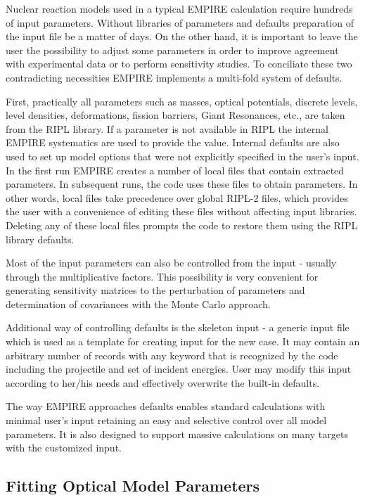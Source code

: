 Nuclear reaction models used in a typical EMPIRE calculation require
hundreds of input parameters. Without libraries of parameters and defaults
preparation of the input file be a matter of days. On the other hand, it is
important to leave the user the possibility to adjust some parameters in
order to improve agreement with experimental data or to perform sensitivity
studies. To conciliate these two contradicting necessities EMPIRE implements
a multi-fold system of defaults.

First, practically all parameters such as masses, optical potentials,
discrete levels, level densities, deformations, fission barriers, Giant
Resonances, etc., are taken from the RIPL library. If a parameter is not
available in RIPL the internal EMPIRE systematics are used to provide the
value. Internal defaults are also used to set up model options that were not
explicitly specified in the user's input. In the first run EMPIRE creates a
number of local files that contain extracted parameters. In subsequent runs,
the code uses these files to obtain parameters. In other words, local files
take precedence over global RIPL-2 files, which provides the user with a
convenience of editing these files without affecting input libraries.
Deleting any of these local files prompts the code to restore them using the
RIPL library defaults.

Most of the input parameters can also be controlled from the input - usually
through the multiplicative factors. This possibility is very convenient for
generating sensitivity matrices to the perturbation of parameters and
determination of covariances with the Monte Carlo approach.

Additional way of controlling defaults is the skeleton input - a generic
input file which is used as a template for creating input for the new case.
It may contain an arbitrary number of records with any keyword that is
recognized by the code including the projectile and set of incident
energies. User may modify this input according to her/his needs and
effectively overwrite the built-in defaults.

The way EMPIRE approaches defaults enables standard calculations with
minimal user's input retaining an easy and selective control over all model
parameters. It is also designed to support massive calculations on many
targets with the customized input.

\subsection{Fitting Optical Model Parameters}

